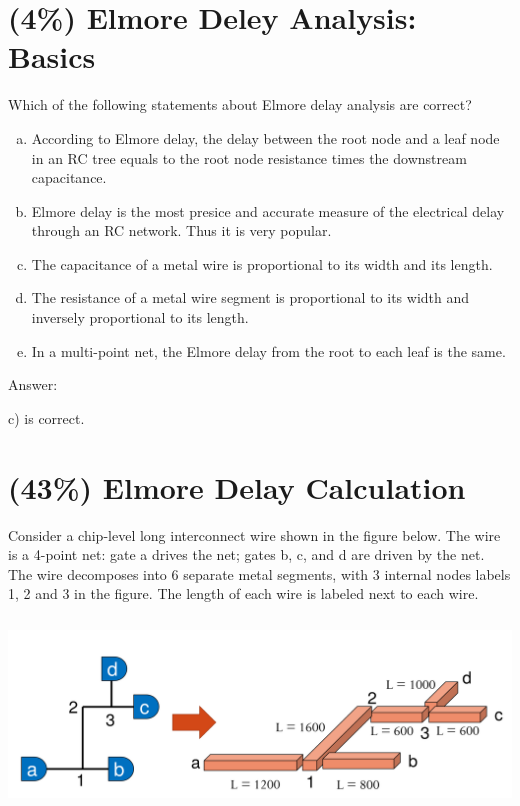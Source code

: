 \documentclass[12pt]{article}
\begin{document}
    \section{(4\%) Elmore Deley Analysis: Basics}
    Which of the following statements about Elmore delay analysis are correct?
    \begin{enumerate}[a)]
        \item According to Elmore delay, the delay between the root node and a leaf node
            in an RC tree equals to the root node resistance times the downstream capacitance.
        \item Elmore delay is the most presice and accurate measure of the electrical delay
            through an RC network. Thus it is very popular.
        \item The capacitance of a metal wire is proportional to its width and its length.
        \item The resistance of a metal wire segment is proportional to its width and inversely
            proportional to its length.
        \item In a multi-point net, the Elmore delay from the root to each leaf is the same.
    \end{enumerate}

    \noindent
    Answer:

    \noindent
    c) is correct.

    \section{(43\%) Elmore Delay Calculation}
    Consider a chip-level long interconnect wire shown in the figure below. The wire is a
    4-point net: gate a drives the net; gates b, c, and d are driven by the net. The wire
    decomposes into 6 separate metal segments, with 3 internal nodes labels 1, 2 and 3 in
    the figure. The length of each wire is labeled next to each wire.

    \begin{center}
        \includegraphics[width = 6.60in, height = 2.00in]{figure3.png}
    \end{center}
\end{document}
